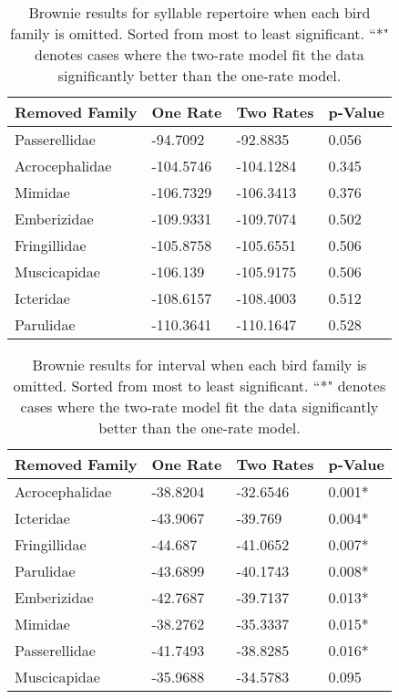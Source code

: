\documentclass[a4paper,12pt]{article}
\begin{document}
\begin{table}[ht]
\caption{Brownie results for syllable repertoire when each bird family is omitted.  Sorted from most to least significant.  ``*" denotes cases where the two-rate model fit the data significantly better than the one-rate model.}
\centering
\begin{tabular}{llll}
  \hline
Removed Family & One Rate & Two Rates & p-Value \\ 
  \hline
Passerellidae & -94.7092 & -92.8835 & 0.056 \\ 
  Acrocephalidae & -104.5746 & -104.1284 & 0.345 \\ 
  Mimidae & -106.7329 & -106.3413 & 0.376 \\ 
  Emberizidae & -109.9331 & -109.7074 & 0.502 \\ 
  Fringillidae & -105.8758 & -105.6551 & 0.506 \\ 
  Muscicapidae & -106.139 & -105.9175 & 0.506 \\ 
  Icteridae & -108.6157 & -108.4003 & 0.512 \\ 
  Parulidae & -110.3641 & -110.1647 & 0.528 \\ 
   \hline
\end{tabular}
\end{table}
\begin{table}[ht]
\caption{Brownie results for interval when each bird family is omitted.  Sorted from most to least significant.  ``*" denotes cases where the two-rate model fit the data significantly better than the one-rate model.}
\centering
\begin{tabular}{llll}
  \hline
Removed Family & One Rate & Two Rates & p-Value \\ 
  \hline
Acrocephalidae & -38.8204 & -32.6546 & 0.001* \\ 
  Icteridae & -43.9067 & -39.769 & 0.004* \\ 
  Fringillidae & -44.687 & -41.0652 & 0.007* \\ 
  Parulidae & -43.6899 & -40.1743 & 0.008* \\ 
  Emberizidae & -42.7687 & -39.7137 & 0.013* \\ 
  Mimidae & -38.2762 & -35.3337 & 0.015* \\ 
  Passerellidae & -41.7493 & -38.8285 & 0.016* \\ 
  Muscicapidae & -35.9688 & -34.5783 & 0.095 \\ 
   \hline
\end{tabular}
\end{table}
\end{document}
